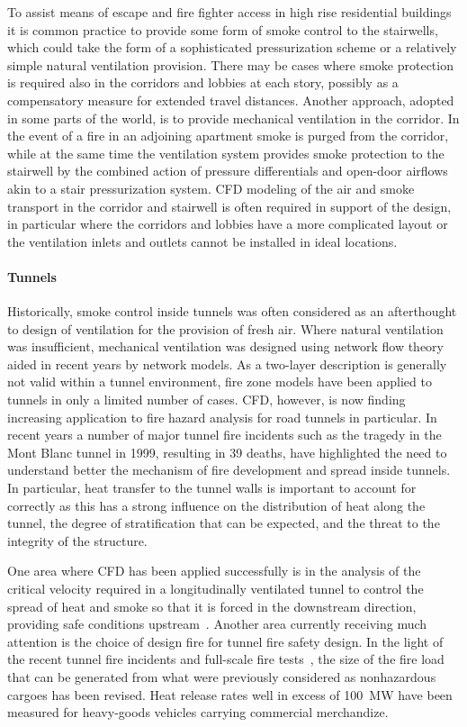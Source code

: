 \documentclass[graybox]{svmult}
\begin{document}
To assist means of escape and fire fighter access in high rise residential buildings it is common practice to provide some form of smoke control to the stairwells, which could take the form of a sophisticated pressurization scheme or a relatively simple natural ventilation provision. There may be cases where smoke protection is required also in the corridors and lobbies at each story, possibly as a compensatory measure for extended travel distances. Another approach, adopted in some parts of the world, is to provide mechanical ventilation in the corridor. In the event of a fire in an adjoining apartment smoke is purged from the corridor, while at the same time the ventilation system provides smoke protection to the stairwell by the combined action of pressure differentials and open-door airflows akin to a stair pressurization system. CFD modeling of the air and smoke transport in the corridor and stairwell is often required in support of the design, in particular where the corridors and lobbies have a more complicated layout or the ventilation inlets and outlets cannot be installed in ideal locations.



\paragraph{Tunnels}

Historically, smoke control inside tunnels was often considered as an afterthought to design of ventilation for the provision of fresh air. Where natural ventilation was insufficient, mechanical ventilation was designed using network flow theory aided in recent years by network models. As a two-layer description is generally not valid within a tunnel environment, fire zone models have been applied to tunnels in only a limited number of cases. CFD, however, is now finding increasing application to fire hazard analysis for road tunnels in particular. In recent years a number of major tunnel fire incidents such as the tragedy in the Mont Blanc tunnel in 1999, resulting in 39 deaths, have highlighted the need to understand better the mechanism of fire development and spread inside tunnels. In particular, heat transfer to the tunnel walls is important to account for correctly as this has a strong influence on the distribution of heat along the tunnel, the degree of stratification that can be expected, and the threat to the integrity of the structure.

One area where CFD has been applied successfully is in the analysis of the critical velocity required in a longitudinally ventilated tunnel to control the spread of heat and smoke so that it is forced in the downstream direction, providing safe conditions upstream~\cite{Hwang}. Another area currently receiving much attention is the choice of design fire for tunnel fire safety design. In the light of the recent tunnel fire incidents and full-scale fire tests~\cite{Ingason}, the size of the fire load that can be generated from what were previously considered as nonhazardous cargoes has been revised. Heat release rates well in excess of 100~MW have been measured for heavy-goods vehicles carrying commercial merchandize.
\end{document}
